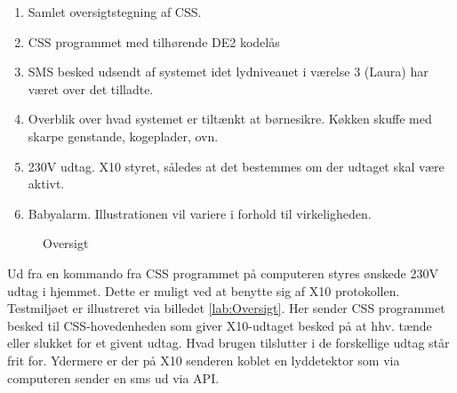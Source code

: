 \begin{enumerate}
\item Samlet oversigtstegning af CSS. 
\item CSS programmet med tilhørende DE2 kodelås
\item SMS besked udsendt af systemet idet lydniveauet i værelse 3 (Laura) har været over det tilladte.
\item Overblik over hvad systemet er tiltænkt at børnesikre. Køkken skuffe med skarpe genstande, kogeplader, ovn.
\item 230V udtag. X10 styret, således at det bestemmes om der udtaget skal være aktivt.
\item Babyalarm. Illustrationen vil variere i forhold til virkeligheden.
\end{enumerate}

\begin{figure}[h] \centering
{}
\caption{Oversigt}
\label{fig:Oversigt}
\end{figure}


Ud fra en kommando fra CSS programmet på computeren styres ønskede 230V udtag i hjemmet. Dette er muligt ved at benytte sig af X10 protokollen. Testmiljøet er illustreret via billedet \ref{lab:Oversigt}. Her sender CSS programmet besked til CSS-hovedenheden som giver X10-udtaget besked på at hhv. tænde eller slukket for et givent udtag. Hvad brugen tilslutter i de forskellige udtag står frit for. Ydermere er der på X10 senderen koblet en lyddetektor som via computeren sender en sms ud via API.